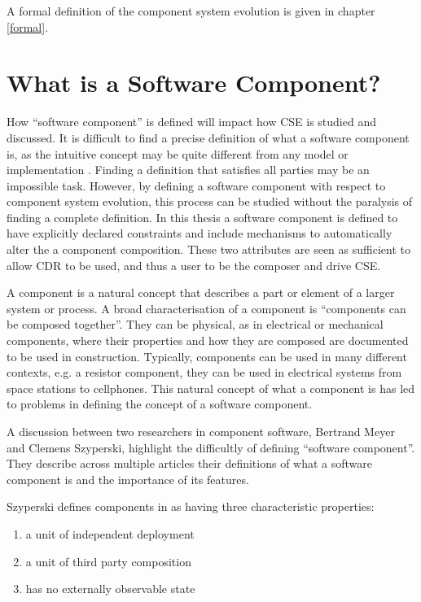 A formal definition of the component system evolution is given in chapter \ref{formal}.

\section{What is a Software Component?}
\label{background.components}
How ``software component'' is defined will impact how CSE is studied and discussed.
It is difficult to find a precise definition of what a software component is, as the intuitive concept may be quite different from any model or implementation \citep{Crnkovic2011}.
Finding a definition that satisfies all parties may be an impossible task.
However, by defining a software component with respect to component system evolution, 
this process can be studied without the paralysis of finding a complete definition.
In this thesis a software component is defined to have explicitly declared constraints and include mechanisms to automatically alter the a component composition.
These two attributes are seen as sufficient to allow CDR to be used, and thus a user to be the composer and drive CSE. 

A component is a natural concept that describes a part or element of a larger system or process.
A broad characterisation of a component is ``components can be composed together''.
They can be physical, as in electrical or mechanical components, where their properties and how they are composed are documented to be used in construction.
Typically, components can be used in many different contexts, e.g. a resistor component, they can be used in electrical systems from space stations to cellphones.   
This natural concept of what a component is has led to problems in defining the concept of a software component.

A discussion between two researchers in component software, Bertrand Meyer and Clemens Szyperski, highlight the difficultly of defining ``software component''. 
They describe across multiple articles \citep{Meyer1999,Szyperski2000a, Szyperski2000, Meyer2000} their definitions of what a software component is and the importance of its features.

Szyperski defines components in \citep{Szyperski2002} as having three characteristic properties:
\begin{enumerate}
  \item a unit of independent deployment
  \item a unit of third party composition
  \item has no externally observable state
\end{enumerate}

